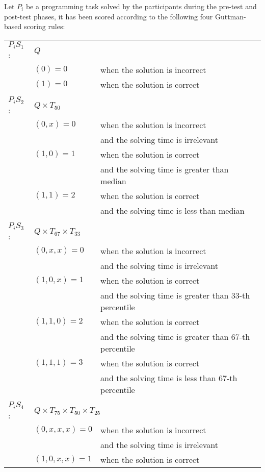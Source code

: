 Let $P_{i}$ be a programming task solved by the participants during the pre-test and post-test phases, it has been scored according to the following four Guttman-based scoring rules: 

\begin{center}\scriptsize
\begin{tabular}{lll}
$P_{i}S_{1}$:&\multicolumn{2}{l}{$Q$}   \\
& $(0) = 0$ &  when the solution is incorrect \\
& $(1) = 0$ &  when the solution is correct \\
& & \\
$P_{i}S_{2}$:&\multicolumn{2}{l}{$Q{\times}T_{50}$} \\
& $(0,x) = 0$ & when the solution is incorrect\\
&  & and the solving time is irrelevant\\
& $(1,0) = 1$ & when the solution is correct\\
& & and the solving time is greater than median\\
& $(1,1) = 2$ & when the solution is correct\\
& & and the solving time is less than median\\
& & \\
$P_{i}S_{3}$:&\multicolumn{2}{l}{$Q{\times}T_{67}{\times}T_{33}$} \\
& $(0,x,x) = 0$ & when the solution is incorrect\\
&  & and the solving time is irrelevant\\
& $(1,0,x) = 1$ & when the solution is correct\\
& & and the solving time is greater than 33-th percentile\\
& $(1,1,0) = 2$ & when the solution is correct\\
& & and the solving time is greater than 67-th percentile\\
& $(1,1,1) = 3$ & when the solution is correct\\
&  & and the solving time is less than 67-th percentile\\
& & \\
$P_{i}S_{4}$:&\multicolumn{2}{l}{$Q{\times}T_{75}{\times}T_{50}{\times}T_{25}$} \\
& $(0,x,x,x) = 0$ & when the solution is incorrect\\
&  & and the solving time is irrelevant\\
& $(1,0,x,x) = 1$ & when the solution is correct\\

\end{tabular}
\end{center}

